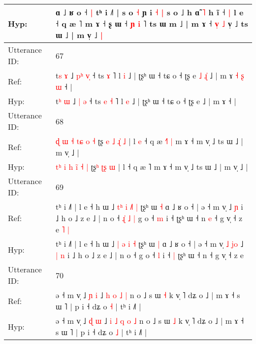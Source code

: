 \documentclass[10pt]{article}
\DeclareRobustCommand{\hl}[1]{{\textcolor{red}{#1}}}
\begin{document}
\begin{longtable}{ll}
 \\
Hyp: & ɑ ˩ ʁ o ˧\hl{ }\hl{|} tʰ i ˩˥ | s o \hl{˧} ɲ i\hl{ }\hl{˧} \hl{|} s o ˩ h ɑ̃ \hl{˥} h ĩ ˧\hl{ }\hl{|} l e ˧ q æ \hl{}˥\hl{}\hl{} m ɤ ˧ ʂ ɯ\hl{}\hl{}\hl{}\hl{}\hl{}\hl{} ˧ \hl{ɲ} \hl{i} ˥ ts ɯ\hl{}\hl{}\hl{}\hl{} m\hl{}\hl{}\hl{} ˩ | m ɤ ˧\hl{ }\hl{v}\hl{̩} \hl{˩} v̩ ˩ ts ɯ ˩ | m v̩ ˩\hl{ }\hl{|}
 \\
\midrule
Utterance ID: & 67 \\
Ref: & t\hl{s} \hl{ɤ} ˩ \hl{p}\hl{ʰ} \hl{v}\hl{̩} ˧ ts\hl{}\hl{} \hl{ɤ} ˥ l \hl{i} ˩ | ʈʂʰ ɯ ˧ tɕ o ˧ ʈʂ e\hl{ }\hl{˩}\hl{ }\hl{ɻ}\hl{̍} ˩ | m ɤ\hl{ }\hl{˧}\hl{ }\hl{ʂ}\hl{ }\hl{ɯ} ˧ |
 \\
Hyp: & t\hl{ʰ} \hl{ɯ} ˩ \hl{}\hl{|} \hl{}\hl{ə} ˧ ts\hl{ }\hl{e} \hl{˧} ˥ l \hl{e} ˩ | ʈʂʰ ɯ ˧ tɕ o ˧ ʈʂ e\hl{}\hl{}\hl{}\hl{}\hl{} ˩ | m ɤ\hl{}\hl{}\hl{}\hl{}\hl{}\hl{} ˧ |
 \\
\midrule
Utterance ID: & 68 \\
Ref: & \hl{}\hl{ɖ} \hl{ɯ} \hl{˧} \hl{t}\hl{ɕ} \hl{o} \hl{˧} ʈʂ\hl{ }\hl{e}\hl{ }\hl{˩} \hl{ɻ}\hl{̍} \hl{˩} | l\hl{ }\hl{e} ˧ q æ \hl{˧}˥\hl{ }\hl{|} m ɤ ˧ m v̩ ˩ ts ɯ ˩ | m v̩ ˩ |
 \\
Hyp: & \hl{t}\hl{ʰ} \hl{i} \hl{h} \hl{i}\hl{̃} \hl{˧} \hl{|} ʈʂ\hl{}\hl{}\hl{}\hl{ʰ} \hl{ʈ}\hl{ʂ} \hl{ɯ} | l\hl{}\hl{} ˧ q æ \hl{}˥\hl{}\hl{} m ɤ ˧ m v̩ ˩ ts ɯ ˩ | m v̩ ˩ |
 \\
\midrule
Utterance ID: & 69 \\
Ref: & tʰ i ˩˥ | l e ˧ h ɯ ˩ \hl{t}\hl{ʰ} \hl{i} \hl{˩}\hl{˥} \hl{|} ʈʂʰ ɯ \hl{˧} ɑ ˩ ʁ o ˧ | ə ˧ m v̩\hl{}\hl{}\hl{}\hl{}\hl{} ˩\hl{}\hl{} \hl{ɲ} i ˩ h o ˩ z e ˩ | n o ˧\hl{ }\hl{ɻ}\hl{̍}\hl{ }\hl{˩}\hl{ }\hl{|} g o ˧ \hl{m} i ˧\hl{}\hl{} ʈʂʰ ɯ ˧ n\hl{ }\hl{e} ˧ g v̩ ˧ z e\hl{ }\hl{˥}\hl{ }\hl{|}
 \\
Hyp: & tʰ i ˩˥ | l e ˧ h ɯ ˩ \hl{}\hl{|} \hl{ə} \hl{}\hl{i} \hl{˧} ʈʂʰ ɯ \hl{|} ɑ ˩ ʁ o ˧ | ə ˧ m v̩\hl{ }\hl{˩}\hl{ }\hl{j}\hl{o} ˩\hl{ }\hl{|} \hl{n} i ˩ h o ˩ z e ˩ | n o ˧\hl{}\hl{}\hl{}\hl{}\hl{}\hl{}\hl{} g o ˧ \hl{l} i ˧\hl{ }\hl{|} ʈʂʰ ɯ ˧ n\hl{}\hl{} ˧ g v̩ ˧ z e\hl{}\hl{}\hl{}\hl{}
 \\
\midrule
Utterance ID: & 70 \\
Ref: & ə ˧ m v̩ ˩ \hl{ɲ} \hl{i} ˩\hl{}\hl{} \hl{h} \hl{o} \hl{˩} \hl{|} n o ˩ s ɯ \hl{˧} k v̩ ˥ dʑ o ˩ | m ɤ ˧ s ɯ ˥ | p i ˧ dʑ o \hl{˧} | tʰ i ˩˥ |
 \\
Hyp: & ə ˧ m v̩ ˩ \hl{ɖ} \hl{ɯ} ˩\hl{ }\hl{i} \hl{˩} \hl{q} \hl{o} \hl{˩} n o ˩ s ɯ \hl{˩} k v̩ ˥ dʑ o ˩ | m ɤ ˧ s ɯ ˥ | p i ˧ dʑ o \hl{˩} | tʰ i ˩˥ |
 \\

\end{longtable}
\end{document}
